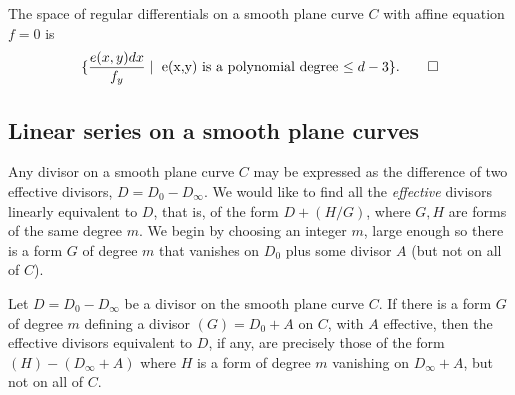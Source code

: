 \begin{theorem}
The space of regular differentials on a smooth plane curve $C$
with affine equation $f=0$ is 
$$
\{ \frac{e(x,y)dx}{f_{y}} \mid \hbox{ e(x,y) is a polynomial degree $\leq d-3$}\}.\qed
 $$
\end{theorem}
%
%

\subsection{Linear series on a smooth plane curves}\label{linear series on smooth plane curves}

Any divisor on a smooth plane curve $C$ may be expressed as the difference of
two effective divisors, $D= D_0-D_\infty$. We would like to find all the \emph{effective} divisors linearly equivalent to $D$, that is, of the form
$D + (H/G)$, where $G, H$ are forms of the same degree $m$. We begin by choosing
an integer $m$, large enough so there is a form $G$ of degree $m$ that vanishes on $D_0$ plus some divisor $A$ (but not on all of $C$). 

\begin{theorem}\label{equiv on smooth plane curve}
Let $D= D_0-D_\infty$ be a divisor on the smooth plane curve $C$. If
there is a form $G$ of degree $m$ defining a divisor $(G) = D_{0}+A$ on $C$, with $A$ effective, then
the effective divisors equivalent to $D$, if any, are precisely those 
of the form $(H) -(D_\infty+A)$ where $H$
is a form of degree $m$ vanishing on $D_\infty+A$, but not on all of $C$.
\end{theorem}

